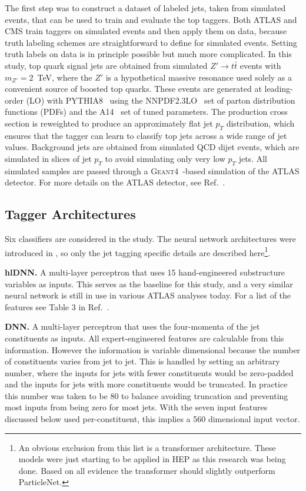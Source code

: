 The first step was to construct a dataset of labeled jets, taken from simulated events, that can be used to train and evaluate the top taggers.
Both ATLAS and CMS train taggers on simulated events and then apply them on data, because truth labeling schemes are straightforward to define for simulated events.
Setting truth labels on data is in principle possible but much more complicated.
In this study, top quark signal jets are obtained from simulated $Z' \rightarrow t\bar{t}$ events with $m_{Z'} = 2$~TeV, where the $Z'$ is a hypothetical massive resonance used solely as a convenient source of boosted top quarks.
These events are generated at leading-order (LO) with \textsc{PYTHIA8}~\cite{Sjostrand:2014zea} using the \textsc{NNPDF2.3LO}~\cite{Ball:2012cx} set of parton distribution functions (PDFs) and the A14~\cite{ATL-PHYS-PUB-2014-021} set of tuned parameters.
The production cross section is reweighted to produce an approximately flat jet $p_T$ distribution, which ensures that the tagger can learn to classify top jets across a wide range of jet \pt values.
Background jets are obtained from simulated QCD dijet events, which are simulated in slices of jet $p_T$ to avoid simulating only very low $p_T$ jets.
All simulated samples are passed through a \textsc{Geant4}~\cite{GEANT4:2002zbu}-based simulation of the ATLAS detector.
For more details on the ATLAS detector, see Ref.~\cite{ATLAS:2008xda}.



\subsection{Tagger Architectures}

Six classifiers are considered in the study.
The neural network architectures were introduced in , so only the jet tagging specific details are described here\footnote{An obvious exclusion from this list is a transformer architecture. These models were just starting to be applied in HEP as this research was being done. Based on all evidence the transformer should slightly outperform ParticleNet.}.

\textbf{hlDNN.} A multi-layer perceptron that uses 15 hand-engineered substructure variables as inputs.
This serves as the baseline for this study, and a very similar neural network is still in use in various ATLAS analyses today.
For a list of the features see Table 3 in Ref.~\cite{ATLAS:2024rua}.

\textbf{DNN.} A multi-layer perceptron that uses the four-momenta of the jet constituents as inputs.
All expert-engineered features are calculable from this information.
However the information is variable dimensional because the number of constituents varies from jet to jet.
This is handled by setting an arbitrary number, where the inputs for jets with fewer constituents would be zero-padded and the inputs for jets with more constituents would be truncated.
In practice this number was taken to be 80 to balance avoiding truncation and preventing most inputs from being zero for most jets.
With the seven input features discussed below used per-constituent, this implies a 560 dimensional input vector.

